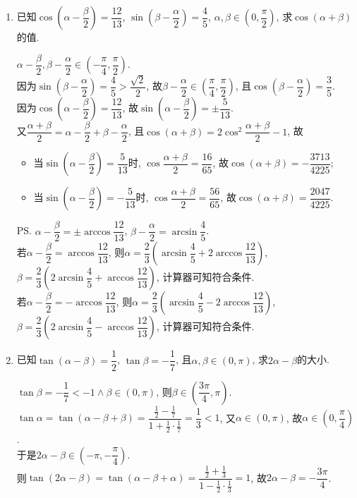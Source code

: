 \begin{enumerate}
\item 已知$\cos\left(\alpha-\dfrac{\beta}{2}\right)=\dfrac{12}{13}$, $\sin\left(\beta-\dfrac{\alpha}{2}\right)=\dfrac{4}{5}$, 
$\alpha,\beta\in\left(0,\dfrac{\pi}{2}\right)$, 求$\cos(\alpha+\beta)$的值. 
\begin{jieda}
$\alpha-\dfrac{\beta}{2},\beta-\dfrac{\alpha}{2}\in\left(-\dfrac{\pi}{4},\dfrac{\pi}{2}\right)$. \\
因为$\sin\left(\beta-\dfrac{\alpha}{2}\right)=\dfrac{4}{5}>\dfrac{\sqrt{2}}{2}$, 故$\beta-\dfrac{\alpha}{2}\in\left(\dfrac{\pi}{4},\dfrac{\pi}{2}\right)$, 
且$\cos\left(\beta-\dfrac{\alpha}{2}\right)=\dfrac{3}{5}$. \\
因为$\cos\left(\alpha-\dfrac{\beta}{2}\right)=\dfrac{12}{13}$, 故$\sin\left(\alpha-\dfrac{\beta}{2}\right)=\pm\dfrac{5}{13}$. \\
又$\dfrac{\alpha+\beta}{2}=\alpha-\dfrac{\beta}{2}+\beta-\dfrac{\alpha}{2}$, 且$\cos(\alpha+\beta)=2\cos^2\dfrac{\alpha+\beta}{2}-1$, 故
\begin{itemize}
\item 当$\sin\left(\alpha-\dfrac{\beta}{2}\right)=\dfrac{5}{13}$时, $\cos\dfrac{\alpha+\beta}{2}=\dfrac{16}{65}$, 故$\cos(\alpha+\beta)=-\dfrac{3713}{4225}$; 
\item 当$\sin\left(\alpha-\dfrac{\beta}{2}\right)=-\dfrac{5}{13}$时, $\cos\dfrac{\alpha+\beta}{2}=\dfrac{56}{65}$, 故$\cos(\alpha+\beta)=\dfrac{2047}{4225}$. 
\end{itemize}
\ps $\alpha-\dfrac{\beta}{2}=\pm\arccos\dfrac{12}{13}$, $\beta-\dfrac{\alpha}{2}=\arcsin\dfrac{4}{5}$. \\
若$\alpha-\dfrac{\beta}{2}=\arccos\dfrac{12}{13}$, 
则$\alpha=\dfrac{2}{3}\left(\arcsin\dfrac{4}{5}+2\arccos\dfrac{12}{13}\right)$, 
$\beta=\dfrac{2}{3}\left(2\arcsin\dfrac{4}{5}+\arccos\dfrac{12}{13}\right)$, 计算器可知符合条件. \\
若$\alpha-\dfrac{\beta}{2}=-\arccos\dfrac{12}{13}$, 
则$\alpha=\dfrac{2}{3}\left(\arcsin\dfrac{4}{5}-2\arccos\dfrac{12}{13}\right)$, 
$\beta=\dfrac{2}{3}\left(2\arcsin\dfrac{4}{5}-\arccos\dfrac{12}{13}\right)$, 计算器可知符合条件. 
\end{jieda}

\item 已知$\tan(\alpha-\beta)=\dfrac{1}{2}$, $\tan\beta=-\dfrac{1}{7}$, 且$\alpha,\beta\in(0,\pi)$, 求$2\alpha-\beta$的大小. 
\begin{jieda}
$\tan\beta=-\dfrac{1}{7}<-1\land\beta\in(0,\pi)$, 则$\beta\in\left(\dfrac{3\pi}{4},\pi\right)$. \\
$\tan\alpha=\tan(\alpha-\beta+\beta)=\dfrac{\frac{1}{2}-\frac{1}{7}}{1+\frac{1}{2}\cdot\frac{1}{7}}=\dfrac{1}{3}<1$, 
又$\alpha\in(0,\pi)$, 故$\alpha\in\left(0,\dfrac{\pi}{4}\right)$. \\
于是$2\alpha-\beta\in\left(-\pi,-\dfrac{\pi}{4}\right)$. \\
则$\tan(2\alpha-\beta)=\tan(\alpha-\beta+\alpha)=\dfrac{\frac{1}{2}+\frac{1}{3}}{1-\frac{1}{2}\cdot\frac{1}{3}}=1$, 
故$2\alpha-\beta=-\dfrac{3\pi}{4}$. 
\end{jieda}



\end{enumerate}
